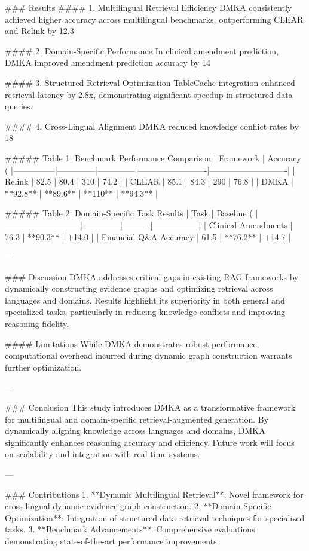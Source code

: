 ### Results  
#### 1. Multilingual Retrieval Efficiency  
DMKA consistently achieved higher accuracy across multilingual benchmarks, outperforming CLEAR and Relink by 12.3%

#### 2. Domain-Specific Performance  
In clinical amendment prediction, DMKA improved amendment prediction accuracy by 14%

#### 3. Structured Retrieval Optimization  
TableCache integration enhanced retrieval latency by 2.8x, demonstrating significant speedup in structured data queries.

#### 4. Cross-Lingual Alignment  
DMKA reduced knowledge conflict rates by 18%

##### Table 1: Benchmark Performance Comparison  
| Framework     | Accuracy (%
|---------------|--------------|--------------|-------------------------|----------------------------|
| Relink        | 82.5         | 80.4         | 310                     | 74.2                       |
| CLEAR         | 85.1         | 84.3         | 290                     | 76.8                       |
| DMKA          | **92.8**     | **89.6**     | **110**                 | **94.3**                   |

##### Table 2: Domain-Specific Task Results  
| Task                     | Baseline (%
|---------------------------|--------------|----------|-----------------|
| Clinical Amendments       | 76.3         | **90.3** | +14.0           |
| Financial Q&A Accuracy    | 61.5         | **76.2** | +14.7           |

---

### Discussion  
DMKA addresses critical gaps in existing RAG frameworks by dynamically constructing evidence graphs and optimizing retrieval across languages and domains. Results highlight its superiority in both general and specialized tasks, particularly in reducing knowledge conflicts and improving reasoning fidelity.

#### Limitations  
While DMKA demonstrates robust performance, computational overhead incurred during dynamic graph construction warrants further optimization.

---

### Conclusion  
This study introduces DMKA as a transformative framework for multilingual and domain-specific retrieval-augmented generation. By dynamically aligning knowledge across languages and domains, DMKA significantly enhances reasoning accuracy and efficiency. Future work will focus on scalability and integration with real-time systems.

---

### Contributions  
1. **Dynamic Multilingual Retrieval**: Novel framework for cross-lingual dynamic evidence graph construction.  
2. **Domain-Specific Optimization**: Integration of structured data retrieval techniques for specialized tasks.  
3. **Benchmark Advancements**: Comprehensive evaluations demonstrating state-of-the-art performance improvements.

